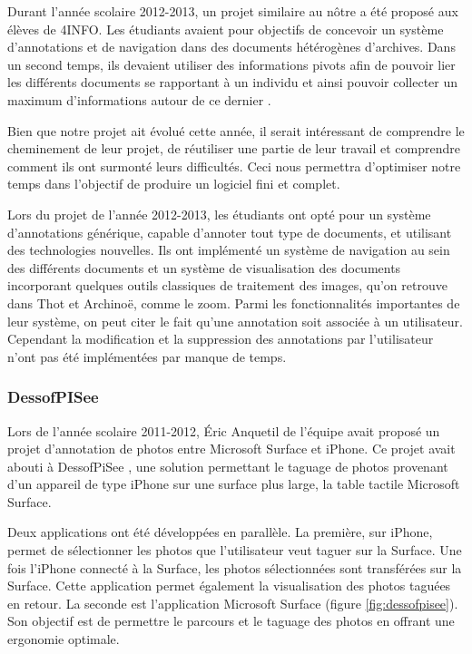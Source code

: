 \documentclass[a4paper]{article}
\begin{document}
	Durant l'ann\'ee scolaire 2012-2013, un projet similaire au n\^otre a \'et\'e propos\'e aux \'el\`eves de 4INFO. Les \'etudiants avaient pour objectifs de concevoir un syst\`eme d'annotations et de navigation dans des documents h\'et\'erog\`enes d'archives. Dans un second temps, ils devaient utiliser des informations pivots afin de pouvoir lier les diff\'erents documents se rapportant \`a un individu et ainsi pouvoir collecter un maximum d'informations autour de ce dernier \cite{genovesa}.

	Bien que notre projet ait \'evolu\'e cette ann\'ee, il serait int\'eressant de comprendre le cheminement de leur projet, de r\'eutiliser une partie de leur travail et comprendre comment ils ont surmont\'e leurs difficult\'es. Ceci nous permettra d'optimiser notre temps dans l'objectif de produire un logiciel fini et complet.

	Lors du projet de l'ann\'ee 2012-2013, les \'etudiants ont opt\'e pour un syst\`eme d'annotations g\'en\'erique, capable d'annoter tout type de documents, et utilisant des technologies nouvelles. Ils ont impl\'ement\'e un syst\`eme de navigation au sein des diff\'erents documents et un syst\`eme de visualisation des documents incorporant quelques outils classiques de traitement des images, qu'on retrouve dans Thot et Archino\"e, comme le zoom. Parmi les fonctionnalit\'es importantes de leur syst\`eme, on peut citer le fait qu'une annotation soit associ\'ee \`a un utilisateur. Cependant la modification et la suppression des annotations par l'utilisateur n'ont pas \'et\'e impl\'ement\'ees par manque de temps.
    
\subsubsection{DessofPISee}

Lors de l'ann\'ee scolaire 2011-2012, \'Eric Anquetil de l'\'equipe  avait propos\'e un projet d'annotation de photos entre Microsoft Surface et iPhone. Ce projet avait abouti \`a DessofPiSee \cite{dessofpisee}, une solution permettant le taguage de photos provenant d'un appareil de type iPhone sur une surface plus large, la table tactile Microsoft Surface. 

Deux applications ont \'et\'e d\'evelopp\'ees en parall\`ele. La premi\`ere, sur iPhone, permet de s\'electionner les photos que l'utilisateur veut taguer sur la Surface. Une fois l'iPhone connect\'e \`a la Surface, les photos s\'electionn\'ees sont transf\'er\'ees sur la Surface. Cette application permet \'egalement la visualisation des photos tagu\'ees en retour. La seconde est l'application Microsoft Surface (figure \ref{fig:dessofpisee}). Son objectif est de permettre le parcours et le taguage des photos en offrant une ergonomie optimale.
\end{document}
